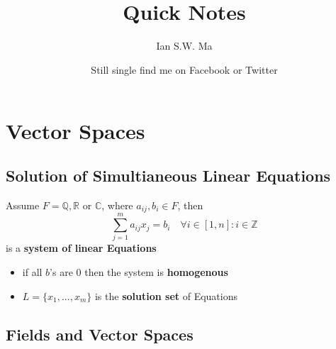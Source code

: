 \documentclass[10pt]{article}
\title{\coursename\\Quick Notes}
\author{Ian S.W. Ma}
\date{Still single find me on Facebook or Twitter}
\theoremstyle{definition}
\begin{document}
\maketitle
\tableofcontents
\newpage

\setcounter{page}{1}
\section{Vector Spaces}

\subsection{Solution of Simultianeous Linear Equations}
Assume \(F = \mathbb{Q},\mathbb{R} \text{ or } \mathbb{C} \), where $a_{ij},b_i \in F$, then
\[
    \sum_{j=1}^m{a_{ij}x_j} = b_i \quad \forall i \in [1,n]:i \in \mathbb{Z}
\]
is a \textbf{system of linear Equations}

\begin{itemize}
    \item if all $b$'s are $0$ then the system is \textbf{homogenous}
    \item $L = \{x_1,...,x_m\}$ is the \textbf{solution set} of Equations
\end{itemize}

\subsection{Fields and Vector Spaces}
\end{document}
